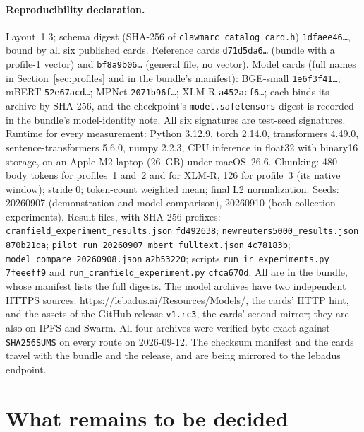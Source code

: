\documentclass[11pt]{article}
\begin{document}
\begingroup\sloppy
\paragraph{Reproducibility declaration.} Layout~1.3; schema digest (SHA-256
of \nolinkurl{clawmarc_catalog_card.h}) \texttt{1dfaee46\ldots}, bound by
all six published cards. Reference cards \texttt{d71d5da6\ldots} (bundle
with a profile-1 vector) and \texttt{bf8a9b06\ldots} (general file, no
vector). Model cards (full names in Section~\ref{sec:profiles} and in the
bundle's manifest): BGE-small \texttt{1e6f3f41\ldots}; mBERT
\texttt{52e67acd\ldots}; MPNet \texttt{2071b96f\ldots}; XLM-R
\texttt{a452acf6\ldots}; each binds its archive by SHA-256, and the
checkpoint's \nolinkurl{model.safetensors} digest is recorded in the bundle's
model-identity note. All six signatures are test-seed signatures. Runtime for every
measurement: Python 3.12.9, torch 2.14.0, transformers 4.49.0,
sentence-transformers 5.6.0, numpy 2.2.3, CPU inference in float32 with
binary16 storage, on an Apple M2 laptop (26~GB) under macOS~26.6. Chunking:
480 body tokens for profiles~1 and~2 and for XLM-R, 126 for profile~3 (its
native window); stride 0; token-count weighted mean; final L2
normalization. Seeds: 20260907 (demonstration and model comparison),
20260910 (both collection experiments). Result files, with SHA-256
prefixes: \nolinkurl{cranfield_experiment_results.json} \texttt{fd492638};
\nolinkurl{newreuters5000_results.json} \texttt{870b21da};
\nolinkurl{pilot_run_20260907_mbert_fulltext.json} \texttt{4c78183b};
\nolinkurl{model_compare_20260908.json} \texttt{a2b53220}; scripts
\nolinkurl{run_ir_experiments.py} \texttt{7feeeff9} and
\nolinkurl{run_cranfield_experiment.py} \texttt{cfca670d}. All are in the
bundle, whose manifest lists the full digests. The model archives have two
independent HTTPS sources: \url{https://lebadus.ai/Resources/Models/}, the
cards' HTTP hint, and the assets of the GitHub release \texttt{v1.rc3}, the
cards' second mirror; they are also on IPFS and Swarm. All four archives were
verified byte-exact against \nolinkurl{SHA256SUMS} on every route on
2026-09-12. The checksum manifest and the cards travel with the bundle and
the release, and are being mirrored to the lebadus endpoint.
\endgroup

\section{What remains to be decided}
\label{sec:governance}
\end{document}
